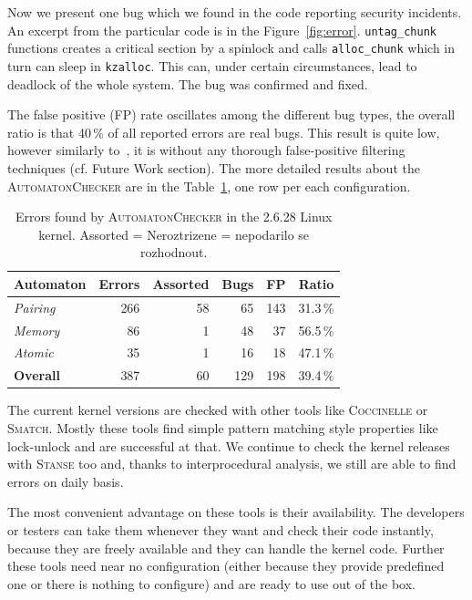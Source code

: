 \documentclass[10pt]{llncs}
\newcommand{\Stanse}{\textsc{Stanse}\xspace}
\newcommand{\AC}{\textsc{AutomatonChecker}\xspace}
\begin{document}
Now we present one bug which we found in the code reporting security
incidents. An excerpt from the particular code is in the
Figure~\ref{fig:error}.  \texttt{untag\_chunk} functions creates a critical
section by a spinlock and calls \texttt{alloc\_chunk} which in turn can sleep
in \texttt{kzalloc}. This can, under certain circumstances, lead to deadlock
of the whole system. The bug was confirmed and fixed.

The false positive (FP) rate oscillates among the different bug types, the
overall ratio is that 40\,\% of all reported errors are real bugs. This result
is quite low, however similarly to~\cite{havoc}, it is without any thorough
false-positive filtering techniques (cf. Future Work section). The more
detailed results about the \AC are in the Table~\ref{tab:results}, one row
per each configuration.

\begin{table}[tb]
\begin{center}
\begin{tabular}{|l|r|r|r|r|r|} \hline
\textbf{Automaton} & \textbf{Errors} & \textbf{Assorted} & \textbf{Bugs} &
\textbf{FP} & \textbf{Ratio} \\ \hline\hline
\textit{Pairing} & 266 & 58 & 65  & 143 & 31.3\,\% \\ \hline
\textit{Memory}  & 86  & 1  & 48  & 37  & 56.5\,\% \\ \hline
\textit{Atomic}  & 35  & 1  & 16  & 18  & 47.1\,\% \\ \hline\hline
\textbf{Overall} & 387 & 60 & 129 & 198 & 39.4\,\% \\ \hline
\end{tabular}
\end{center}
\caption{Errors found by \AC in the 2.6.28 Linux kernel. Assorted = Neroztrizene = nepodarilo se rozhodnout.}
\label{tab:results}
\end{table}

The current kernel versions are checked with other tools like
\textsc{Coccinelle} or \textsc{Smatch}. Mostly these tools find simple pattern
matching style properties like lock-unlock and are successful at that. We
continue to check the kernel releases with \Stanse too and, thanks to
interprocedural analysis, we still are able to find errors on daily basis.

The most convenient advantage on these tools is their availability. The
developers or testers can take them whenever they want and check their code
instantly, because they are freely available and they can handle the kernel
code. Further these tools need near no configuration (either because they
provide predefined one or there is nothing to configure) and are ready to use
out of the box.
\end{document}

